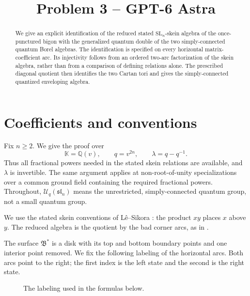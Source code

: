 \documentclass[11pt]{amsart}
\title{Problem 3 -- GPT-6 Astra}
\date{}
\theoremstyle{remark}
\newcommand{\kk}{\mathbb{K}}
\newcommand{\UU}{\mathcal U_q}
\newcommand{\Bstar}{\mathfrak B^{*}}
\newcommand{\slie}{\mathfrak{sl}_n}
\begin{document}
\maketitle

\begin{abstract}
We give an explicit identification of the reduced stated
$\mathrm{SL}_n$-skein algebra of the once-punctured bigon with the
generalized quantum double of the two simply-connected quantum
Borel algebras.  The identification is specified on every horizontal
matrix-coefficient arc.  Its injectivity follows from an ordered
two-arc factorization of the skein algebra, rather than from a
comparison of defining relations alone.  The prescribed diagonal
quotient then identifies the two Cartan tori and gives the
simply-connected quantized enveloping algebra.
\end{abstract}

\section{Coefficients and conventions}

Fix $n\geq 2$.  We give the proof over
\[
  \kk=\mathbb Q(v),\qquad q=v^{2n},\qquad
  \lambda=q-q^{-1}.
\]
Thus all fractional powers needed in the stated skein relations are
available, and $\lambda$ is invertible.  The same argument applies
at non-root-of-unity specializations over a common ground field
containing the required fractional powers.  Throughout,
$\UU(\slie)$ means the unrestricted, simply-connected quantum group,
not a small quantum group.

We use the stated skein conventions of L\^e--Sikora
\cite{LS}: the product $xy$ places $x$ above $y$.
The reduced algebra is the quotient by the bad corner arcs, as in
\cite[Section~7.1]{LY}.

The surface $\Bstar$ is a disk with its top and bottom boundary
points and one interior point removed.  We fix the following
labeling of the horizontal arcs.  Both arcs point to the right;
the first index is the left state and the second is the right state.

\begin{figure}[ht]
\centering
{}
\caption{The labeling used in the formulas below.}
\label{fig:bigon}
\end{figure}
\end{document}
